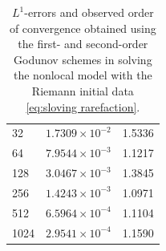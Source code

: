 \begin{table}[H]
\begin{minipage}{0.5\textwidth}
\begin{tabular}{ |p{1.5cm}||p{2.2cm}| |p{1.5cm}| }
            32              & $1.7309 \times 10^{-2}$  & 1.5336       \\
            64              & $7.9544 \times 10^{-3}$  & 1.1217       \\
            128             & $3.0467 \times 10^{-3}$  & 1.3845       \\
            256             & $1.4243 \times 10^{-3}$  & 1.0971       \\
            512             & $6.5964 \times 10^{-4}$  & 1.1104       \\
            1024            & $ 2.9541 \times 10^{-4}$ & 1.1590       \\
            \hline
        \end{tabular}
        \caption*{(b) Second-order Godunov scheme}
    \end{minipage}

    \caption{$L^{1}$-errors and observed order of convergence obtained using the first- and second-order Godunov schemes in solving the nonlocal model with the Riemann initial data \eqref{eq:sloving rarefaction}.}
    \label{tab:table_7}
\end{table}

